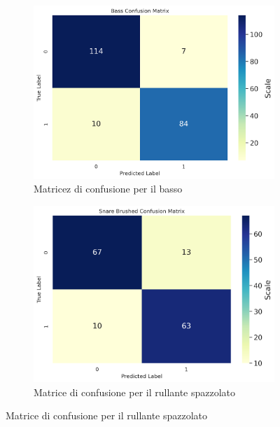 \begin{figure}[h]
	\centering
	\begin{subfigure}{.5\linewidth}
		\includegraphics[width=\linewidth]{./immagini/first_classification/cb_cm.png} 
		\caption{Matricez di confusione per il basso}
		\label{fig:1a}
	\end{subfigure}\hfill
	\begin{subfigure}{.5\linewidth}
		\includegraphics[width=\linewidth]{./immagini/first_classification/sn_brushed_cm.png}
		\caption{Matrice di confusione per il rullante spazzolato}
		\label{fig:1b}
	\end{subfigure}
	

\end{figure}
